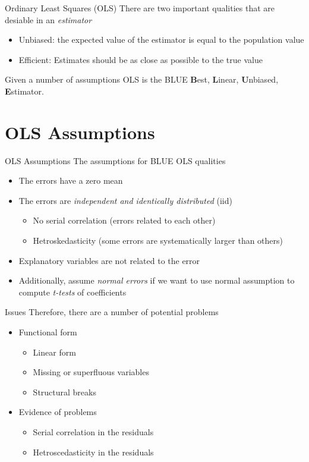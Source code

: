 \documentclass[14pt,xcolor=pdftex,dvipsnames,table]{beamer}\usepackage[]{graphicx}\usepackage[]{color}
\begin{document}
\begin{frame}{Ordinary Least Squares (OLS)}
There are two important qualities that are desiable in an \emph{estimator}
\begin{itemize}[<+-| alert@+>]
\item Unbiased:  the expected value of the estimator is equal to the population value
\item Efficient: Estimates should be as close as possible to the true value 
\end{itemize}
\pause
Given a number of assumptions OLS is the BLUE \textbf{B}est, \textbf{L}inear, \textbf{U}nbiased, \textbf{E}stimator.   
\end{frame}

\section{OLS Assumptions}
\begin{frame}{OLS Assumptions}
The assumptions for BLUE OLS qualities
\pause
\begin{itemize}[<+-| alert@+>]
\item The errors have a zero mean
\item The errors are \emph{independent and identically distributed} (iid)
\begin{itemize}
\item No serial correlation (errors related to each other)
\item Hetroskedasticity (some errors are systematically larger than others)
\end{itemize}
\item Explanatory variables are not related to the error
\item Additionally, assume \emph{normal errors} if we want to use normal assumption to compute \emph{t-tests} of coefficients
\end{itemize}
\end{frame}

\begin{frame}{Issues}
Therefore, there are a number of potential problems
\begin{itemize}[<+-| alert@+>]
\item Functional form
\begin{itemize}
\item Linear form
\item Missing or superfluous variables
\item Structural breaks
\end{itemize}
\item Evidence of problems
\begin{itemize}
\item Serial correlation in the residuals
\item Hetroscedasticity in the residuals
\end{itemize}
\end{itemize}
\end{frame}
\end{document}
